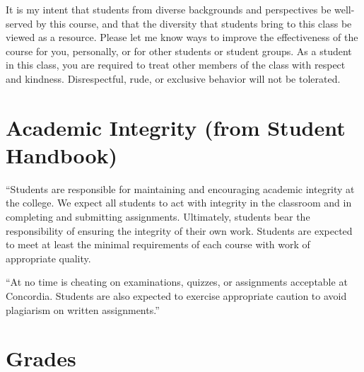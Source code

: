 \documentclass{tufte-handout}
\begin{document}
\begin{fullwidth}
It is my intent that students from diverse backgrounds and perspectives be well-served by this course, and that the diversity that students bring to this class be viewed as a resource. Please let me know ways to improve the effectiveness of the course for you, personally, or for other students or student groups. As a student in this class, you are required to treat other members of the class with respect and kindness. Disrespectful, rude, or exclusive behavior will not be tolerated.

\end{fullwidth}

\section{Academic Integrity (from Student Handbook)}



``Students are responsible for maintaining and encouraging academic integrity at the college. We expect all students to act with integrity in the classroom and in completing and submitting assignments. Ultimately, students bear the responsibility of ensuring the integrity of their own work. Students are expected to meet at least the minimal requirements of each course with work of appropriate quality. 


``At no time is cheating on examinations, quizzes, or assignments acceptable at Concordia. Students are also expected to exercise appropriate caution to avoid plagiarism on written assignments.''

\section{Grades}
\end{document}
